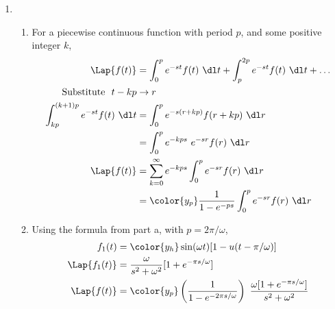 \begin{enumerate}
    \item \begin{enumerate}
              \item For a piecewise continuous function with period $ p $, and some positive
                    integer $ k $,
                    \begin{align}
                        \Lap\{f(t)\}               & = \int_{0}^{p}
                        e^{-st}f(t)\ \dl t + \int_{p}^{2p} e^{-st}f(t)\ \dl t + \dots \\
                        \text{Substitute }\ t - kp & \rightarrow r                    \\
                        \int_{kp}^{(k+1)p} e^{-st}f(t)
                        \ \dl t                    & = \int_{0}^{p}
                        e^{-s(r + kp)} f(r + kp)\ \dl r                               \\
                                                   & = \int_{0}^{p} e^{-kps}
                        \ e^{-sr} f(r)\ \dl r                                         \\
                        \Lap\{f(t)\}               & = \sum_{k = 0}^{\infty}
                        e^{-kps} \int_{0}^{p} e^{-sr}f(r)\ \dl r                      \\
                                                   & = \color{y_p} \frac{1}
                        {1 - e^{-ps}} \int_{0}^{p} e^{-sr}f(r)\ \dl r
                    \end{align}

              \item Using the formula from part a, with $ p = 2\pi / \omega $,
                    \begin{align}
                        f_1(t)         & = \color{y_h} \sin(\omega t)
                        [1 - u(t - \pi / \omega)]                        \\
                        \Lap\{f_1(t)\} & = \frac{\omega}{s^2 + \omega^2}
                        [1 + e^{-\pi s/ \omega}]                         \\
                        \Lap\{f(t)\}   & = \color{y_p} \left( \frac{1}
                        {1 - e^{-2\pi s/ \omega}}\right)\
                        \frac{\omega [1 + e^{-\pi s / \omega}]}{s^2 + \omega^2}
                    \end{align}


\end{enumerate}
\end{enumerate}
